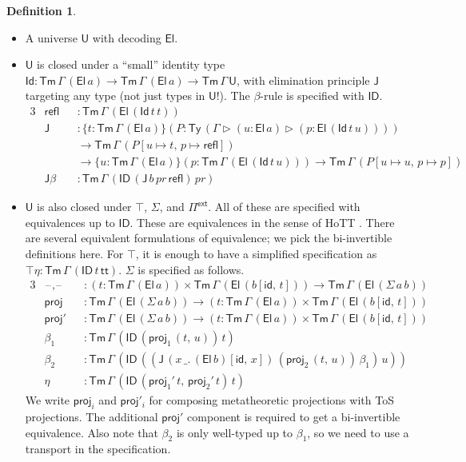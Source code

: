 \documentclass[12pt,a4paper,twoside,openany]{book}
\theoremstyle{remark}
\theoremstyle{definition}
\newtheorem{mydefinition}{Definition}
\theoremstyle{theorem}
\newcommand{\mi}[1]{\mathit{#1}}
\newcommand{\ms}[1]{\mathsf{#1}}
\newcommand{\J}{\ms{J}}
\newcommand{\refl}{\mathsf{refl}}
\newcommand{\id}{\mathsf{id}}
\newcommand{\Tm}{\mathsf{Tm}}
\newcommand{\Ty}{\mathsf{Ty}}
\newcommand{\U}{\mathsf{U}}
\newcommand{\El}{\mathsf{El}}
\newcommand{\Id}{\mathsf{Id}}
\newcommand{\ID}{\mathsf{ID}}
\newcommand{\proj}{\mathsf{proj}}
\renewcommand{\tt}{\mathsf{tt}}
\newcommand{\blank}{\mathord{\hspace{1pt}\text{--}\hspace{1pt}}}
\newcommand{\ext}{\triangleright}
\newcommand{\Piinf}{\Pi^{\mathsf{ext}}}
\begin{document}
\begin{mydefinition}
\begin{itemize}
\item A universe $\U$ with decoding $\El$.
\item
  $\U$ is closed under a ``small'' identity type $\Id : \Tm\,\Gamma\,(\El\,a)
  \to \Tm\,\Gamma\,(\El\,a) \to \Tm\,\Gamma\,\U$, with elimination principle
  $\J$ targeting any type (not just types in $\U$!). The $\beta$-rule is
  specified with $\ID$.
  \begin{alignat*}{3}
  & \refl &&: \Tm\,\Gamma\,(\El\,(\Id\,t\,t))\\
  & \J &&: \{t : \Tm\,\Gamma\,(\El\,a)\}
         (P : \Ty\,(\Gamma\ext(u : \El\,a)\ext(p : \El\,(\Id\,t\,u))))\\
  & &&\to \Tm\,\Gamma\,(P[u \mapsto t,\,p \mapsto \refl])\\
  & &&\to \{u : \Tm\,\Gamma\,(\El\,a)\}
       (p : \Tm\,\Gamma\,(\El\,(\Id\,t\,u)))
  \to \Tm\,\Gamma\,(P[u \mapsto u,\,p \mapsto p])\\
  &\J\beta &&: \Tm\,\Gamma\,(\ID\,(\J\,b\,\mi{pr}\,\refl)\,\mi{pr})
  \end{alignat*}
\item
  $\U$ is also closed under $\top$, $\Sigma$, and $\Piinf$. All of these are
  specified with equivalences up to $\ID$. These are equivalences in the sense
  of HoTT \cite[Chapter~4]{hottbook}. There are several equivalent formulations
  of equivalence; we pick the bi-invertible definitions here. For $\top$, it is
  enough to have a simplified specification as $\top\!\eta :
  \Tm\,\Gamma\,(\ID\,t\,\tt)$. $\Sigma$ is specified as follows.
  \begin{alignat*}{3}
   &\ms{\blank\!,\!\blank} &&:
      (t : \Tm\,\Gamma\,(\El\,a)) \times \Tm\,\Gamma\,(\El\,(b[\id,\,t]))
    \to \Tm\,\Gamma\,(\El\,(\Sigma\,a\,b))\\
   &\ms{proj}         &&: \Tm\,\Gamma\,(\El\,(\Sigma\,a\,b))
    \to (t : \Tm\,\Gamma\,(\El\,a)) \times \Tm\,\Gamma\,(\El\,(b[\id,\,t]))\\
   &\ms{proj'}        &&: \Tm\,\Gamma\,(\El\,(\Sigma\,a\,b))
     \to (t : \Tm\,\Gamma\,(\El\,a)) \times \Tm\,\Gamma\,(\El\,(b[\id,\,t]))\\
   &\beta_1 &&: \Tm\,\Gamma\,(\ID\,(\proj_1\,(t,\,u))\,t)\\
   &\beta_2 &&: \Tm\,\Gamma\,(\ID\,((\J\,(x\,\_.\,(\El\,b)[\id,\,x])\,(\proj_2\,(t,\,u))\,\beta_1)\,u))\\
   &\eta    &&: \Tm\,\Gamma\,(\ID\,(\proj_1'\,t,\,\proj_2'\,t)\,t)
  \end{alignat*}
  We write $\proj_i$ and $\proj'_i$ for composing metatheoretic projections with
  ToS projections. The additional $\proj'$ component is required to get a
  bi-invertible equivalence. Also note that $\beta_2$ is only well-typed up to
  $\beta_1$, so we need to use a transport in the specification.


\end{itemize}
\end{mydefinition}
\end{document}
